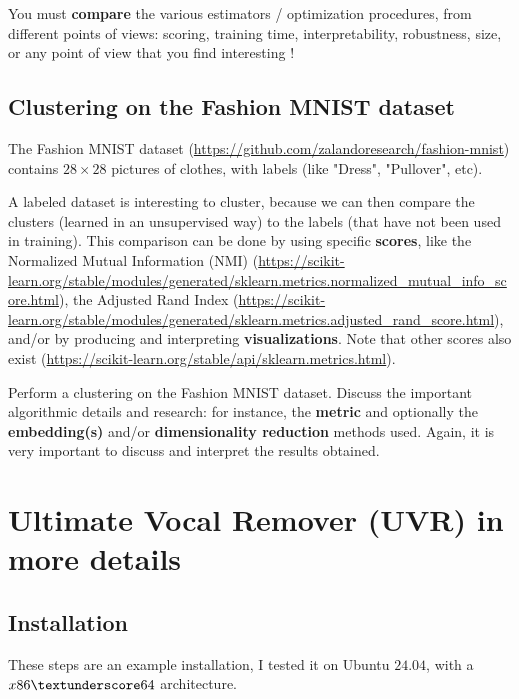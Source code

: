 \documentclass[
10pt, %
a4paper, %
oneside, %
headinclude,footinclude, %
BCOR5mm, %
]{scrartcl}
\begin{document}
You must \textbf{compare} the various estimators / optimization procedures, from different points of views: scoring, training time, interpretability, robustness, size, or any point of view that you find interesting !

\subsection{Clustering on the Fashion MNIST dataset}
\label{sub:fashion}

The Fashion MNIST dataset (\url{https://github.com/zalandoresearch/fashion-mnist}) contains $28 \times 28$ pictures of clothes, with labels (like "Dress", "Pullover", etc).

A labeled dataset is interesting to cluster, because we can then compare the clusters (learned in an unsupervised way) to the labels (that have not been used in training). This comparison can be done by using specific \textbf{scores}, like the Normalized Mutual Information (NMI) (\url{https://scikit-learn.org/stable/modules/generated/sklearn.metrics.normalized_mutual_info_score.html}), the Adjusted Rand Index (\url{https://scikit-learn.org/stable/modules/generated/sklearn.metrics.adjusted_rand_score.html}), and/or by producing and interpreting \textbf{visualizations}. Note that other scores also exist (\url{https://scikit-learn.org/stable/api/sklearn.metrics.html}).

Perform a clustering on the Fashion MNIST dataset. Discuss the important algorithmic details and research: for instance, the \textbf{metric} and optionally the \textbf{embedding(s)} and/or \textbf{dimensionality reduction} methods used. Again, it is very important to discuss and interpret the results obtained.

\appendix

\section{Ultimate Vocal Remover (UVR) in more details}%
\label{app:uvr}

\subsection{Installation}%
\label{app:uvr_install}

These steps are an example installation, I tested it on Ubuntu $24.04$, with a $x86\textunderscore 64$ architecture.
\end{document}

